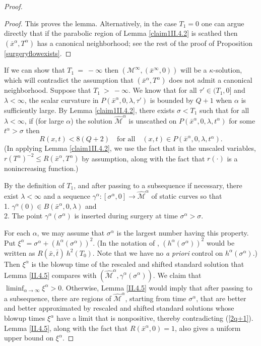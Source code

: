 \documentclass[12pt]{amsart}
\newcommand{\al}{\alpha}
\newcommand{\M}{{\mathcal M}}
\newcommand{\si}{\sigma}
\newcommand{\ga}{\gamma}
\newcommand{\la}{\lambda}
\newcommand{\ra}{\rightarrow}
\numberwithin{equation}{section}
\theoremstyle{plain}
\theoremstyle{definition}
\theoremstyle{remark}
\begin{document}
\begin{proof}
\begin{proof}
This proves the lemma.  Alternatively, in the case $T_1 = 0$
one can argue directly that if the parabolic region of
Lemma \ref{claim1II.4.2} is scathed then 
$(\overline{x}^\al, T^\al)$ has a canonical neighborhood;
see the rest of the proof of Proposition \ref{surgeryflowexists}.
\end{proof}

If we can show that
$T_1 \: = \: -\infty$ then $(\M^\infty,(\bar x^\infty,0))$
will be a $\kappa$-solution, which will contradict the assumption
that $(\bar x^\al,T^\al)$ does not admit a canonical neighborhood.
Suppose that $T_1 \: > \: -\infty$.
We know that for all 
$\tau' \in (T_1, 0]$
and $\la<\infty$, the scalar curvature in $P(\bar x^\al,0,\la,\tau')$
is bounded by $Q+1$ when $\al$ is sufficiently large.  By 
Lemma \ref{claim1II.4.2}, there exists $\sigma< T_1$ such that for all
$\la<\infty$, if (for large $\al$) 
the solution $\widehat\M^\al$ is unscathed on
$P(\bar x^\al,0,\la,t^\al)$ for some $t^\al > \sigma$ then
\begin{equation}
\label{2q+1}
R(x,t)< 8(Q+2)\quad\mbox{for all}\quad (x,t)\in P(\bar x^\al,0,\la,t^\al).
\end{equation}
(In applying Lemma \ref{claim1II.4.2}, we use the fact that in the unscaled
variables,
$r(T^\al)^{-2} \le R(\bar x^\al,T^\al)$ by assumption, along with
the fact that $r(\cdot)$ is a nonincreasing function.)


By the definition of $T_1$, and after passing
to a subsequence if necessary, there exist $\la<\infty$ and a sequence
$\ga^\al:[\si^\al,0]\ra\widehat\M^\al$  of static curves so that  \\
1. $\ga^\al(0)\in B(\bar x^\al,0,\la)$ and \\
2. The point
$\ga^\al(\si^\al)$ is inserted during surgery at time $\si^\al>\si$.

For each $\al$, we may assume that $\si^\al$ is the largest number having
this property.
Put
$\xi^\al= \si^\al+\left( h^\al(\si^\al)\right)^2$.
(In the notation of \cite{Perelman2}, 
$\left( h^\al(\si^\al)\right)^2$ would be written
as $R(\bar x, \bar t) \: h^2(T_0)$. Note that we have no {\it a priori} control
on $h^\al(\si^\al)$.) Then $\xi^\al$
is the blowup time of the rescaled and shifted
standard solution that Lemma \ref{II.4.5}
compares with $(\widehat\M^\al,\ga^\al(\si^\al))$.  We claim
that $\liminf_{\al\ra\infty}\xi^\al>0$. Otherwise, Lemma 
\ref{II.4.5} would imply that after passing to a subsequence,
there are regions of
$\widehat\M^\al$, starting from time $\si^\al$, that are better and better
approximated by rescaled and shifted standard solutions whose blowup times
$\xi^\al$ have a limit that is nonpositive,
thereby contradicting (\ref{2q+1}). Lemma \ref{II.4.5}, along with
the fact that $R({\bar x}^\al, 0) = 1$, also gives a uniform upper bound
on $\xi^\al$.


\end{proof}
\end{document}
